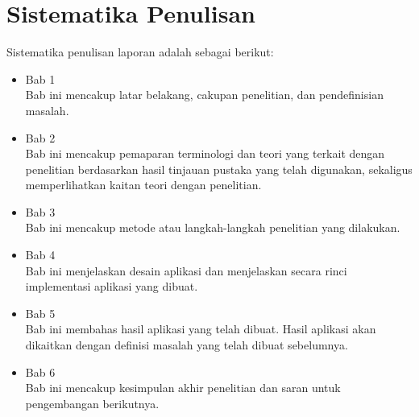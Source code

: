 \section{Sistematika Penulisan}
\label{sec:sistematikaPenulisan}
Sistematika penulisan laporan adalah sebagai berikut:
\begin{itemize}
	\item Bab 1 \babSatu \\
	    Bab ini mencakup latar belakang, cakupan penelitian, dan pendefinisian masalah.
	\item Bab 2 \babDua \\
	    Bab ini mencakup pemaparan terminologi dan teori yang terkait dengan penelitian berdasarkan hasil tinjauan pustaka yang telah digunakan, sekaligus memperlihatkan kaitan teori dengan penelitian.
	\item Bab 3 \babTiga \\
	    Bab ini mencakup metode atau langkah-langkah penelitian yang dilakukan. 
	\item Bab 4 \babEmpat \\
		Bab ini menjelaskan desain aplikasi dan menjelaskan secara rinci implementasi aplikasi yang dibuat.
	\item Bab 5 \babLima \\
	    Bab ini membahas hasil aplikasi yang telah dibuat. Hasil aplikasi akan dikaitkan dengan definisi masalah yang telah dibuat sebelumnya.
	\item Bab 6 \kesimpulan \\
	    Bab ini mencakup kesimpulan akhir penelitian dan saran untuk pengembangan berikutnya.
\end{itemize}
